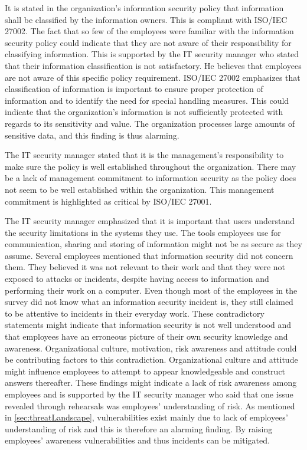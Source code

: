 It is stated in the organization's information security policy that information shall be classified by the information owners. This is compliant with ISO/IEC 27002. The fact that so few of the employees were familiar with the information security policy could indicate that they are not aware of their responsibility for classifying information. This is supported by the IT security manager who stated that their information classification is not satisfactory. He believes that employees are not aware of this specific policy requirement. ISO/IEC 27002 emphasizes that classification of information is important to ensure proper protection of information and to identify the need for special handling measures. This could indicate that the organization's information is not sufficiently protected with regards to its sensitivity and value. The organization processes large amounts of sensitive data, and this finding is thus alarming.

The IT security manager stated that it is the management's responsibility to make sure the policy is well established throughout the organization. There may be a lack of management commitment to information security as the policy does not seem to be well established within the organization. This management commitment is highlighted as critical by ISO/IEC 27001. 

The IT security manager emphasized that it is important that users understand the security limitations in the systems they use. The tools employees use for communication, sharing and storing of information might not be as secure as they assume. Several employees mentioned that information security did not concern them. They believed it was not relevant to their work and that they were not exposed to attacks or incidents, despite having access to information and performing their work on a computer. Even though most of the employees in the survey did not know what an information security incident is, they still claimed to be attentive to incidents in their everyday work. These contradictory statements might indicate that information security is not well understood and that employees have an erroneous picture of their own security knowledge and awareness. Organizational culture, motivation, risk awareness and attitude could be contributing factors to this contradiction. Organizational culture and attitude might influence employees to attempt to appear knowledgeable and construct answers thereafter. These findings might indicate a lack of risk awareness among employees and is supported by the IT security manager who said that one issue revealed through rehearsals was employees' understanding of risk. As mentioned in \ref{sec:threatLandscape}, vulnerabilities exist mainly due to lack of employees' understanding of risk and this is therefore an alarming finding. By raising employees' awareness vulnerabilities and thus incidents can be mitigated.

